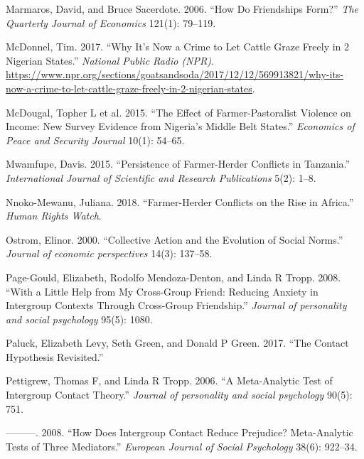 \documentclass[11pt]{article}
\begin{document}
\leavevmode\hypertarget{ref-marmaros2006friendships}{}%
Marmaros, David, and Bruce Sacerdote. 2006. ``How Do Friendships Form?''
\emph{The Quarterly Journal of Economics} 121(1): 79--119.

\leavevmode\hypertarget{ref-mcdonnel2017graze}{}%
McDonnel, Tim. 2017. ``Why It's Now a Crime to Let Cattle Graze Freely
in 2 Nigerian States.'' \emph{National Public Radio (NPR)}.
\url{https://www.npr.org/sections/goatsandsoda/2017/12/12/569913821/why-its-now-a-crime-to-let-cattle-graze-freely-in-2-nigerian-states}.

\leavevmode\hypertarget{ref-mcdougal2015effect}{}%
McDougal, Topher L et al. 2015. ``The Effect of Farmer-Pastoralist
Violence on Income: New Survey Evidence from Nigeria's Middle Belt
States.'' \emph{Economics of Peace and Security Journal} 10(1): 54--65.

\leavevmode\hypertarget{ref-mwamfupe2015persistence}{}%
Mwamfupe, Davis. 2015. ``Persistence of Farmer-Herder Conflicts in
Tanzania.'' \emph{International Journal of Scientific and Research
Publications} 5(2): 1--8.

\leavevmode\hypertarget{ref-hrc2018farmer}{}%
Nnoko-Mewanu, Juliana. 2018. ``Farmer-Herder Conflicts on the Rise in
Africa.'' \emph{Human Rights Watch}.

\leavevmode\hypertarget{ref-ostrom2000collective}{}%
Ostrom, Elinor. 2000. ``Collective Action and the Evolution of Social
Norms.'' \emph{Journal of economic perspectives} 14(3): 137--58.

\leavevmode\hypertarget{ref-page2008little}{}%
Page-Gould, Elizabeth, Rodolfo Mendoza-Denton, and Linda R Tropp. 2008.
``With a Little Help from My Cross-Group Friend: Reducing Anxiety in
Intergroup Contexts Through Cross-Group Friendship.'' \emph{Journal of
personality and social psychology} 95(5): 1080.

\leavevmode\hypertarget{ref-paluck2017contact}{}%
Paluck, Elizabeth Levy, Seth Green, and Donald P Green. 2017. ``The
Contact Hypothesis Revisited.''

\leavevmode\hypertarget{ref-pettigrew2006meta}{}%
Pettigrew, Thomas F, and Linda R Tropp. 2006. ``A Meta-Analytic Test of
Intergroup Contact Theory.'' \emph{Journal of personality and social
psychology} 90(5): 751.

\leavevmode\hypertarget{ref-pettigrew2008does}{}%
---------. 2008. ``How Does Intergroup Contact Reduce Prejudice?
Meta-Analytic Tests of Three Mediators.'' \emph{European Journal of
Social Psychology} 38(6): 922--34.
\end{document}
